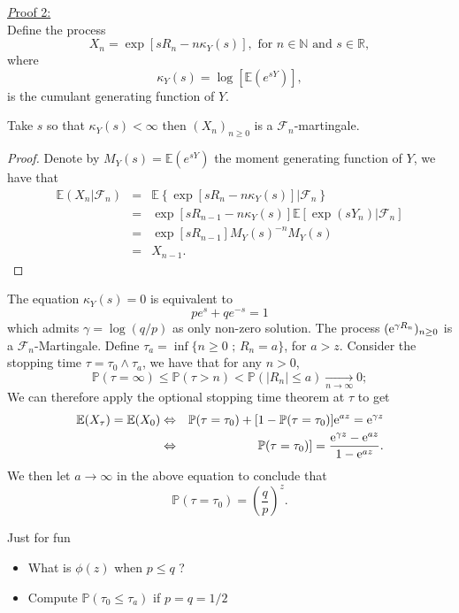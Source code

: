 \underline{\textit Proof 2:}\\
Define the process 
$$
X_n = \exp\left[sR_n- n\kappa_Y(s)\right],\text{ for }n\in\mathbb{N}\text{ and }s\in\mathbb{R}, 
$$
where
$$
\kappa_Y(s) = \log\left[\mathbb{E}\left(e^{sY}\right)\right],
$$
is the cumulant generating function of $Y$. 
\begin{lemma}\label{lem:wald_martingale_RW}
Take $s$ so that $\kappa_Y(s)<\infty$ then $(X_n)_{n\geq0}$ is a $\mathcal{F}_n$-martingale.
\end{lemma}
\begin{proof}
Denote by $M_Y(s) = \mathbb{E}(e^{sY})$ the moment generating function of $Y$, we have that 
\begin{eqnarray*}
\mathbb{E}(X_n|\mathcal{F}_n)&=&\mathbb{E}\left\{\exp\left[sR_n - n\kappa_Y(s)\right]|\mathcal{F}_n\right\}\\
&=&\exp\left[sR_{n-1} - n\kappa_Y(s)\right]\mathbb{E}\left[\exp\left(sY_{n}\right)|\mathcal{F}_n\right]\\
&=&\exp\left[sR_{n-1} \right]M_Y(s)^{-n} M_Y(s)\\
&=& X_{n-1}.
\end{eqnarray*}
\end{proof} 
The equation $\kappa_Y(s) = 0$ is equivalent to 
$$
pe^s+qe^{-s} = 1
$$
which admits $\gamma =\log(q/p)$ as only non-zero solution. The process $(\mathrm{e}^{\gamma R_n})_{n\geq0}$ is a $\mathcal{F}_n$-Martingale. Define $\tau_a = \inf\{n\geq 0\text{ ; }R_n = a\}$, for $a>z$. Consider the stopping time $\tau = \tau_0\land\tau_a$, we have that for any $n>0$, 
$$
\mathbb{P}( \tau=\infty) \leq \mathbb{P}( \tau > n) < \mathbb{P}( |R_n| \leq a) \underset{n\rightarrow \infty}{\longrightarrow} 0;
$$
We can therefore apply the optional stopping time theorem at $\tau$ to get
\begin{eqnarray*}
 \mathbb{E}(X_{\tau}) = \mathbb{E}(X_{0})&\Leftrightarrow& \mathbb{P}(\tau = \tau_0) + [1- \mathbb{P}(\tau = \tau_0)]\mathrm{e}^{a z}= \mathrm{e}^{\gamma z}\\
 &\Leftrightarrow& \mathbb{P}(\tau = \tau_0)] = \frac{\mathrm{e}^{\gamma z}-\mathrm{e}^{a z}}{1-\mathrm{e}^{az}}.
\end{eqnarray*}
We then let $a\rightarrow\infty$ in the above equation to conclude that 
$$
\mathbb{P}(\tau = \tau_0) =\left(\frac{q}{p}\right)^z.
$$
\begin{exercise}
Just for fun
\begin{itemize}
\item What is $\phi(z)$ when $p \leq q$ ? 
\item Compute $\mathbb{P}(\tau_0 \leq \tau_a)$ if $p = q = 1/2$
\end{itemize}
\end{exercise}
